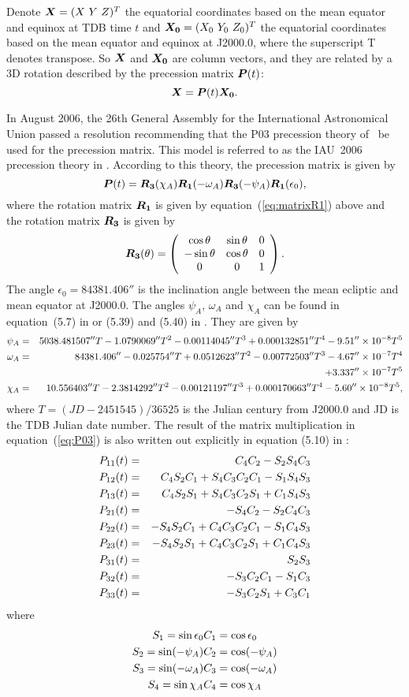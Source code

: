 \documentclass[12pt]{article}
\newcommand \beq {\begin{equation}}
\newcommand \eeq {\end{equation}}
\newcommand \beqn {\begin{eqnarray}}
\newcommand \eeqn {\end{eqnarray}}
\newcommand{\ve}[1]{\mbox{\boldmath $#1$}}
\newcommand{\kaplan}{\cite{kaplan05}}
\newcommand{\iers}{\cite{iers2010}}
\begin{document}
\begin{CJK}{UTF8}{bkai}
Denote $\ve{X}=(X\ Y\ Z)^T$ the equatorial coordinates based on 
the mean equator and equinox at TDB time $t$ and $\ve{X_0}=(X_0\ Y_0\ Z_0)^T$ 
the equatorial coordinates based on the mean equator and equinox at J2000.0,
where the superscript T denotes transpose. So $\ve{X}$ and $\ve{X_0}$ are column 
vectors, and they are related by a 3D rotation described by the precession matrix 
$\ve{P}(t)$: 
\beq
  \ve{X} = \ve{P}(t) \ve{X_0} . 
\eeq

In August 2006, the 26th General Assembly for the International Astronomical Union 
passed a resolution recommending that the P03 precession theory of~\cite{capitaine03}
be used for the precession matrix. 
This model is referred to as the IAU~2006 precession theory in \iers.
According to this theory, the precession matrix is given by 
\beq
  \ve{P}(t) = \ve{R_3}(\chi_A) \ve{R_1}(-\omega_A) \ve{R_3}(-\psi_A) \ve{R_1}(\epsilon_0) ,
\label{eq:P03}
\eeq
where the rotation matrix $\ve{R_1}$ is given by equation~(\ref{eq:matrixR1}) above 
and the rotation matrix $\ve{R_3}$ is given by 
\beq
  \ve{R_3}(\theta) = \left( \begin{array}{ccc} 
\cos \theta & \sin \theta & 0 \\ 
-\sin \theta & \cos \theta & 0 \\ 
0 & 0 & 1 \end{array} \right) .
\label{eq:matrixR3}
\eeq
The angle $\epsilon_0 = 84381.406''$ is the inclination angle between the mean ecliptic and 
mean equator at J2000.0. The angles $\psi_A$, $\omega_A$ and $\chi_A$ can be found 
in equation~(5.7) in \kaplan or (5.39) and (5.40) in \iers.
They are given by 
\beqn
  \psi_A &=& 5038.481507'' T - 1.0790069'' T^2 - 0.00114045'' T^3 
+ 0.000132851'' T^4 - 9.51''\times 10^{-8} T^5 \cr 
  \omega_A &=& 84381.406'' - 0.025754'' T + 0.0512623'' T^2 - 0.00772503'' T^3 
- 4.67''\times 10^{-7} T^4 \cr && + 3.337'' \times 10^{-7} T^5 \label{eq:precessionAngles} \\ 
  \chi_A &=& 10.556403'' T - 2.3814292'' T^2 - 0.00121197'' T^3 + 0.000170663'' T^4 
- 5.60'' \times 10^{-8} T^5 ,  \nonumber
\eeqn
where $T=(JD - 2451545)/36525$ is the Julian century from J2000.0 and JD is the 
TDB Julian date number. The result of the matrix multiplication in equation~(\ref{eq:P03}) 
is also written out explicitly in equation (5.10) in \kaplan: 
\beqn
  P_{11}(t) &=& C_4 C_2 - S_2 S_4 C_3 \cr
  P_{12}(t) &=& C_4 S_2 C_1 + S_4 C_3 C_2 C_1 - S_1 S_4 S_3 \cr
  P_{13}(t) &=& C_4 S_2 S_1 + S_4 C_3 C_2 S_1 + C_1 S_4 S_3 \cr 
  P_{21}(t) &=& -S_4 C_2 - S_2 C_4 C_3 \cr 
  P_{22}(t) &=& -S_4 S_2 C_1 + C_4 C_3 C_2 C_1 - S_1 C_4 S_3 \label{eq:matP} \\
  P_{23}(t) &=& -S_4 S_2 S_1 + C_4 C_3 C_2 S_1 + C_1 C_4 S_3 \cr 
  P_{31}(t) &=& S_2 S_3 \cr 
  P_{32}(t) &=& -S_3 C_2 C_1 - S_1 C_3 \cr 
  P_{33}(t) &=& -S_3 C_2 S_1 + C_3 C_1 \nonumber
\eeqn
where 
\beqn
  S_1 = \sin \epsilon_0 & C_1 = \cos \epsilon_0 \cr 
  S_2 = \sin (-\psi_A) & C_2 = \cos (-\psi_A) \label{def:S1234} \\ 
  S_3 = \sin (-\omega_A) & C_3 = \cos (-\omega_A) \cr 
  S_4 = \sin \chi_A & C_4 = \cos \chi_A  \nonumber
\eeqn


\end{CJK}
\end{document}
